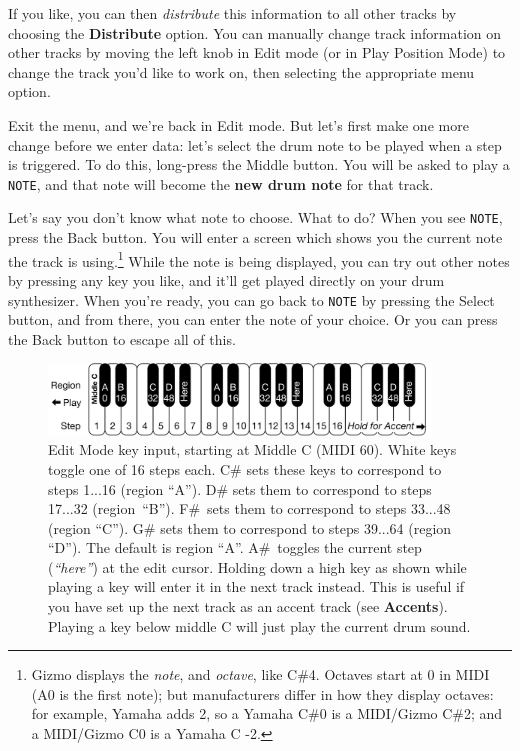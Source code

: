 \documentclass{article}
\begin{document}
If you like, you can then {\it distribute} this information to all other tracks by choosing the {\bf Distribute} option.  You can manually change track information on other tracks by moving the left knob in Edit mode (or in Play Position Mode) to change the track you'd like to work on, then selecting the appropriate menu option.

Exit the menu, and we're back in Edit mode.  But let's first make one more change before we enter data: let's select the drum note to be played when a step is triggered.  To do this, long-press the Middle button.  You will be asked to play a {\tt NOTE}, and that note will become the {\bf new drum note} for that track.  

\enlargethispage{0.5em}
Let's say you don't know what note to choose.  What to do?  When you see {\tt NOTE}, press the Back button.   You will enter a screen which shows you the current note the track is using.\footnote{Gizmo displays the {\it note}, and {\it octave}, like C\#4.  Octaves start at 0 in MIDI (A0 is the first note); but manufacturers differ in how they display octaves: for example, Yamaha adds 2, so a Yamaha C\#0 is a MIDI/Gizmo C\#2; and a MIDI/Gizmo C0 is a Yamaha C -2.}   While the note is being displayed, you can try out other notes by pressing any key you like, and it'll get played directly on your drum synthesizer.  When you're ready, you can go back to {\tt NOTE} by pressing the Select button, and from there, you can enter the note of your choice.  Or you can press the Back button to escape all of this.

\begin{figure}
\vspace{-0.5em}
\hspace{\fill}\includegraphics[width=4in]{EditModeKeys}
\vspace{-1em}
\caption{\small Edit Mode key input, starting at Middle C (MIDI 60).  White keys toggle one of 16 steps each.  C\# sets these keys to correspond to steps 1...16 (region ``A'').  D\# sets them to correspond to steps 17...32 (region~``B'').  F\#~sets them to correspond to steps 33...48 (region ``C'').  G\# sets them to correspond to steps 39...64 (region ``D'').  The default is region ``A''.  A\#~toggles the current step ({\it ``here''}) at the edit cursor.  Holding down a high key as shown while playing a key will enter it in the next track instead.  This is useful if you have set up the next track as an accent track (see {\bf Accents}).  Playing a key below middle C will just play the current drum sound.}
\label{editmodekeys}
\end{figure}
\end{document}
